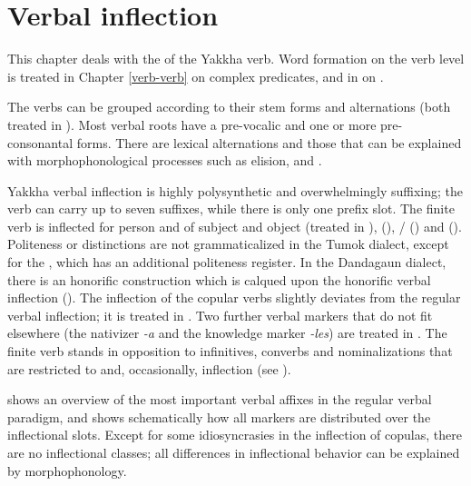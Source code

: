 \chapter{Verbal inflection}\label{verbalmorph}

This chapter deals with the  of the Yakkha verb. Word formation on the verb level is treated in  Chapter \ref{verb-verb} on complex predicates, and in  on .

The verbs can be grouped according to their stem forms and alternations (both treated in ). Most verbal roots have a pre-vocalic and one or more pre-con\-so\-nan\-tal  forms. There are lexical alternations and those that can be explained with morphophonological processes such as elision,  and . 

Yakkha verbal inflection is highly polysynthetic and overwhelmingly suffixing; the verb can carry up to seven suffixes, while there is only one prefix slot. The finite verb is  inflected for person and  of subject and object (treated in ),  (),  / () and   (). Politeness or  distinctions are not grammaticalized in the Tumok dialect, except for the , which has an additional politeness register. In the Dandagaun dialect,  there is an honorific construction which is calqued upon the  honorific verbal inflection  (). The inflection of the copular verbs slightly deviates from the regular verbal inflection; it is treated in . Two further verbal markers that do not fit elsewhere (the nativizer \emph{-a} and the knowledge marker \emph{-les})  are treated in . The finite verb stands in opposition to infinitives, converbs and nominalizations that are restricted to  and, occasionally,  inflection (see ). 



 shows an overview of the most important verbal affixes in the regular verbal paradigm, and  shows schematically how all  markers are distributed over the inflectional slots. Except for some idiosyncrasies in the inflection of copulas, there are no inflectional classes; all differences in inflectional behavior can be explained by morphophonology. 


